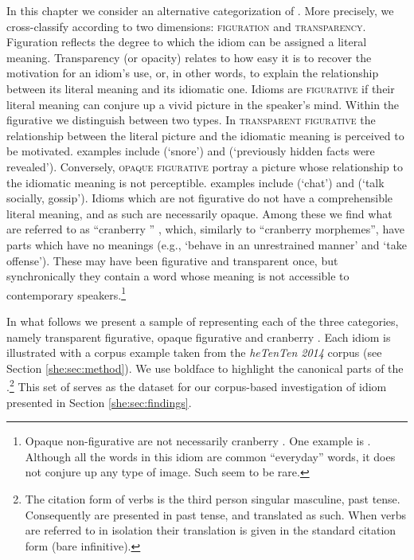 \documentclass[output=paper]{langsci/langscibook}
\begin{document}
In this chapter we consider an alternative categorization of . More precisely, we cross-classify  according to two dimensions: {\scshape figuration} and {\scshape transparency}. Figuration reflects the degree to which the idiom can be assigned a literal meaning. Transparency (or opacity) relates to how easy it is to recover the motivation for an idiom's use, or, in other words, to explain the relationship between its literal meaning and its idiomatic one. Idioms are {\scshape figurative} if their literal meaning can conjure up a vivid picture in the speaker's mind. Within the figurative  we distinguish between two types. In {\scshape transparent figurative}  the relationship between the literal picture and the idiomatic meaning is perceived to be motivated.  examples include  (`snore') and  (`previously hidden facts were revealed'). Conversely, {\scshape opaque figurative}  portray a picture whose relationship to the idiomatic meaning is not perceptible.  examples include  (`chat') and  (`talk socially, gossip'). Idioms which are not figurative do not have a comprehensible literal meaning, and as such are necessarily opaque. Among these  we find what are referred to as ``cranberry '' \citep{moon98,trawinskisailersoehnetal.2008}, which, similarly to ``cranberry morphemes'', have parts which have no meanings (e.g.,  `behave in an unrestrained manner' and  `take offense'). These  may have been figurative and transparent once, but synchronically they contain a word whose meaning is not accessible to contemporary speakers.\footnote{Opaque non-figurative  are not necessarily cranberry . One  example is . Although all the words in this idiom are common ``everyday'' words, it does not conjure up any type of image. Such  seem to be rare.}

In what follows we present a sample of   representing each of the three categories, namely transparent figurative, opaque figurative and cranberry . Each idiom is illustrated with a corpus example taken from the \emph{heTenTen 2014} corpus (see Section \ref{she:sec:method}). We use boldface to highlight the canonical parts of the .\footnote{The citation form of  verbs is the third person singular masculine,
past tense. Consequently  are presented in past tense, and translated as such. When verbs are referred to in isolation their translation is given in the standard  citation form (bare infinitive).} This set of  serves as the dataset for our corpus-based investigation of idiom  presented in Section \ref{she:sec:findings}.
\end{document}
